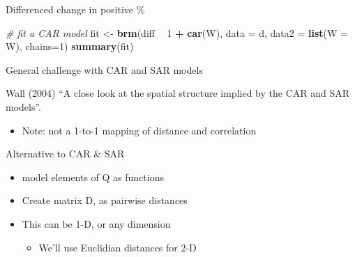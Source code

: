 \documentclass[
  ignorenonframetext,
]{beamer}
\newenvironment{Shaded}{\begin{snugshade}}{\end{snugshade}}
\newcommand{\CommentTok}[1]{\textcolor[rgb]{0.56,0.35,0.01}{\textit{#1}}}
\newcommand{\DataTypeTok}[1]{\textcolor[rgb]{0.13,0.29,0.53}{#1}}
\newcommand{\DecValTok}[1]{\textcolor[rgb]{0.00,0.00,0.81}{#1}}
\newcommand{\KeywordTok}[1]{\textcolor[rgb]{0.13,0.29,0.53}{\textbf{#1}}}
\newcommand{\NormalTok}[1]{#1}
\newcommand{\OperatorTok}[1]{\textcolor[rgb]{0.81,0.36,0.00}{\textbf{#1}}}
\newcommand{\StringTok}[1]{\textcolor[rgb]{0.31,0.60,0.02}{#1}}
\providecommand{\tightlist}{%
  \setlength{\itemsep}{0pt}\setlength{\parskip}{0pt}}
\begin{document}
\begin{frame}[fragile]{Differenced change in positive \%}
\protect\hypertarget{differenced-change-in-positive-1}{}

\begin{Shaded}
\begin{Highlighting}[]
\CommentTok{# fit a CAR model}
\NormalTok{fit <-}\StringTok{ }\KeywordTok{brm}\NormalTok{(diff }\OperatorTok{~}\StringTok{ }\DecValTok{1} \OperatorTok{+}\StringTok{ }\KeywordTok{car}\NormalTok{(W), }
           \DataTypeTok{data =}\NormalTok{ d, }\DataTypeTok{data2 =} \KeywordTok{list}\NormalTok{(}\DataTypeTok{W =}\NormalTok{ W), }\DataTypeTok{chains=}\DecValTok{1}\NormalTok{) }
\KeywordTok{summary}\NormalTok{(fit)}
\end{Highlighting}
\end{Shaded}

\end{frame}

\begin{frame}{General challenge with CAR and SAR models}
\protect\hypertarget{general-challenge-with-car-and-sar-models}{}

Wall (2004) ``A close look at the spatial structure implied by the CAR
and SAR models''.

\begin{itemize}
\tightlist
\item
  Note: not a 1-to-1 mapping of distance and correlation
\end{itemize}

\end{frame}

\begin{frame}{Alternative to CAR \& SAR}
\protect\hypertarget{alternative-to-car-sar}{}

\begin{itemize}
\tightlist
\item
  model elements of Q as functions
\item
  Create matrix D, as pairwise distances
\item
  This can be 1-D, or any dimension

  \begin{itemize}
  \tightlist
  \item
    We'll use Euclidian distances for 2-D
  \end{itemize}
\end{itemize}

\end{frame}
\end{document}
